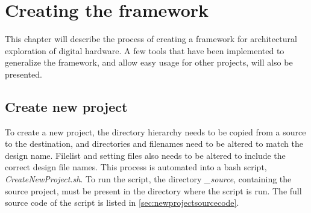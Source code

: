 \chapter{\label{chp:createframework}Creating the framework}
This chapter will describe the process of creating a framework for architectural exploration of digital hardware. A few tools that have been implemented to generalize the framework, and allow easy usage for other projects, will also be presented. 
\section{Create new project}
To create a new project, the directory hierarchy needs to be copied from a source to the destination, and directories and filenames need to be altered to match the design name. Filelist and setting files also needs to be altered to include the correct design file names. This process is automated into a bash script, \textit{CreateNewProject.sh}. To run the script, the directory \textit{\_source}, containing the source project, must be present in the directory where the script is run. The full source code of the script is listed in \cref{sec:newprojectsourcecode}.

